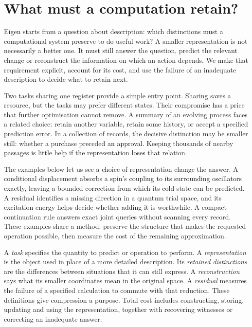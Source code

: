 \section{What must a computation retain?}
Eigen starts from a question about description: which distinctions must a computational system preserve to do useful work? A smaller representation is not necessarily a better one. It must still answer the question, predict the relevant change or reconstruct the information on which an action depends. We make that requirement explicit, account for its cost, and use the failure of an inadequate description to decide what to retain next.

Two tasks sharing one register provide a simple entry point. Sharing saves a resource, but the tasks may prefer different states. Their compromise has a price that further optimisation cannot remove. A summary of an evolving process faces a related choice: retain another variable, retain some history, or accept a specified prediction error. In a collection of records, the decisive distinction may be smaller still: whether a purchase preceded an approval. Keeping thousands of nearby passages is little help if the representation loses that relation.

The examples below let us see a choice of representation change the answer. A conditional displacement absorbs a spin's coupling to its surrounding oscillators exactly, leaving a bounded correction from which its cold state can be predicted. A residual identifies a missing direction in a quantum trial space, and its excitation energy helps decide whether adding it is worthwhile. A compact continuation rule answers exact joint queries without scanning every record. These examples share a method: preserve the structure that makes the requested operation possible, then measure the cost of the remaining approximation.

A \emph{task} specifies the quantity to predict or operation to perform. A \emph{representation} is the object used in place of a more detailed description. Its \emph{retained distinctions} are the differences between situations that it can still express. A \emph{reconstruction} says what its smaller coordinates mean in the original space. A \emph{residual} measures the failure of a specified calculation to commute with that reduction. These definitions give compression a purpose. Total cost includes constructing, storing, updating and using the representation, together with recovering witnesses or correcting an inadequate answer.

